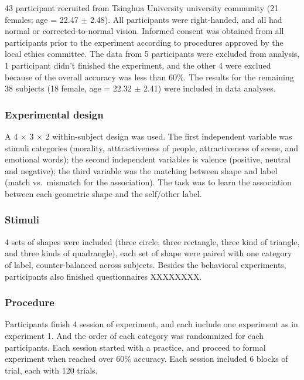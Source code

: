 \documentclass[man]{apa6}
\begin{document}
43 participant recruited from Tsinghua University university community (21 females; age = 22.47 \(\pm\) 2.48). All participants were right-handed, and all had normal or corrected-to-normal vision. Informed consent was obtained from all participants prior to the experiment according to procedures approved by the local ethics committee. The data from 5 participants were excluded from analysis, 1 participant didn't finished the experiment, and the other 4 were exclued because of the overall accuracy was less than 60\%. The results for the remaining 38 subjects (18 female, age = 22.32 \(\pm\) 2.41) were included in data analyses.

\hypertarget{experimental-design-2}{%
\subsubsection{Experimental design}\label{experimental-design-2}}

A 4 × 3 × 2 within-subject design was used. The first independent variable was stimuli categories (morality, atttractiveness of people, attractiveness of scene, and emotional words); the second independent variables is valence (positive, neutral and negative); the third variable was the matching between shape and label (match vs.~mismatch for the association). The task was to learn the association between each geometric shape and the self/other label.

\hypertarget{stimuli-3}{%
\subsubsection{Stimuli}\label{stimuli-3}}

4 sets of shapes were included (three circle, three rectangle, three kind of triangle, and three kinds of quadrangle), each set of shape were paired with one category of label, counter-balanced across subjects. Besides the behavioral experiments, participants also finished questionnaires XXXXXXXX.

\hypertarget{procedure-8}{%
\subsubsection{Procedure}\label{procedure-8}}

Participants finish 4 session of experiment, and each include one experiment as in experiment 1. And the order of each category was randomnized for each participants. Each session started with a practice, and proceed to formal experiment when reached over 60\% accuracy. Each session included 6 blocks of trial, each with 120 trials.
\end{document}

